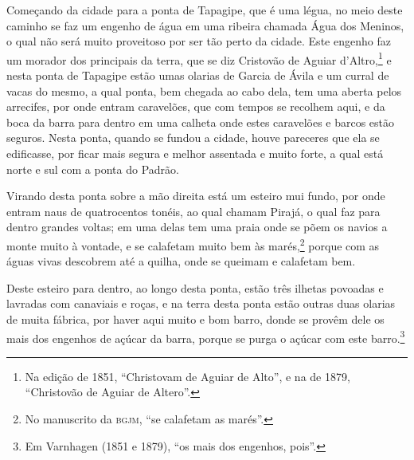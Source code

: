 \begin{linenumbers}
Começando da cidade para a ponta de Tapagipe, que é uma légua, no meio deste caminho se
faz um engenho de água em uma ribeira chamada Água dos Meninos, o qual não será muito
proveitoso por ser tão perto da cidade. Este engenho faz um morador dos principais da
terra, que se diz Cristovão de Aguiar d'Altro,\footnote{ Na edição de 1851, ``Christovam
de Aguiar de Alto'', e na de 1879, ``Christovão de Aguiar de Altero''.} e nesta ponta de
Tapagipe estão umas olarias de Garcia de Ávila e um curral de vacas do mesmo, a qual
ponta, bem chegada ao cabo dela, tem uma aberta pelos arrecifes, por onde entram
caravelões, que com tempos se recolhem aqui, e da boca da barra para dentro em uma calheta
onde estes caravelões e barcos estão seguros. Nesta ponta, quando se fundou a cidade,
houve pareceres que ela se edificasse, por ficar mais segura e melhor assentada e muito
forte, a qual está norte e sul com a ponta do Padrão.

Virando desta ponta sobre a mão direita está um esteiro mui fundo, por onde entram naus de
quatrocentos tonéis, ao qual chamam Pirajá, o qual faz para dentro grandes voltas; em uma
delas tem uma praia onde se põem os navios a monte muito à vontade, e se calafetam muito
bem às marés,\footnote{ No manuscrito da \textsc{bgjm}, ``se calafetam as marés''.} porque
com as águas vivas descobrem até a quilha, onde se queimam e calafetam bem.

Deste esteiro para dentro, ao longo desta ponta, estão três ilhetas povoadas e lavradas
com canaviais e roças, e na terra desta ponta estão outras duas olarias de muita fábrica,
por haver aqui muito e bom barro, donde se provêm dele os mais dos engenhos de açúcar da
barra, porque se purga o açúcar com este barro.\footnote{ Em Varnhagen (1851 e 1879), ``os
mais dos engenhos, pois''.}


\end{linenumbers}
